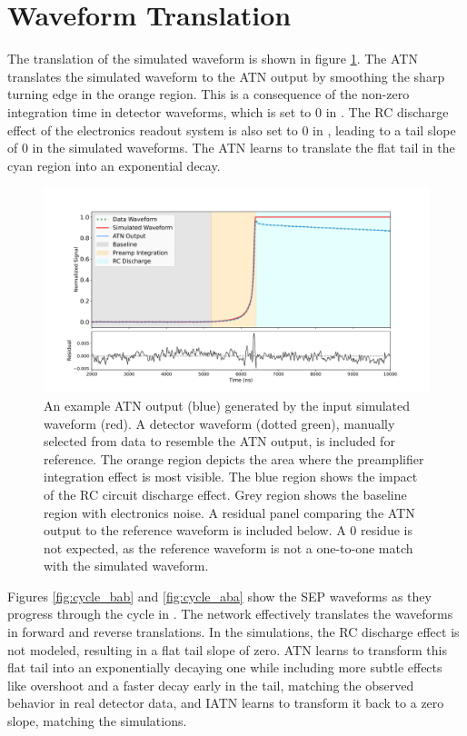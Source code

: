 \section{Waveform Translation}
The translation of the simulated waveform is shown in figure \ref{ch8_fig_sample_result}. The ATN translates the simulated waveform to the ATN output by smoothing the sharp turning edge in the orange region. This is a consequence of the non-zero integration time in detector waveforms, which is set to $0$ in {\siggen}. The RC discharge effect of the electronics readout system is also set to $0$ in {\siggen}, leading to a tail slope of $0$ in the simulated waveforms. The ATN learns to translate the flat tail in the cyan region into an exponential decay.

\begin{figure}[htb!]
    \includegraphics[width=\linewidth,trim={2.0cm 0pc 3.0cm 0pc},clip]{ch8/figs/wf_comp_sim_atn_data.pdf}
    \caption{An example ATN output (blue) generated by the input simulated waveform (red). A detector waveform (dotted green), manually selected from data to resemble the ATN output, is included for reference. The orange region depicts the area where the preamplifier integration effect is most visible. The blue region shows the impact of the RC circuit discharge effect. Grey region shows the baseline region with electronics noise. A residual panel comparing the ATN output to the reference waveform is included below. A $0$ residue is not expected, as the reference waveform is not a one-to-one match with the simulated waveform.} 
   \label{ch8_fig_sample_result}
\end{figure}

Figures \ref{fig:cycle_bab} and \ref{fig:cycle_aba} show the SEP waveforms as they progress through the cycle in {\cpunet}. The network effectively translates the waveforms in forward and reverse translations. In the {\siggen} simulations, the RC discharge effect is not modeled, resulting in a flat tail slope of zero. ATN learns to transform this flat tail into an exponentially decaying one while including more subtle effects like overshoot and a faster decay early in the tail, matching the observed behavior in real detector data, and IATN learns to transform it back to a zero slope, matching the simulations.

